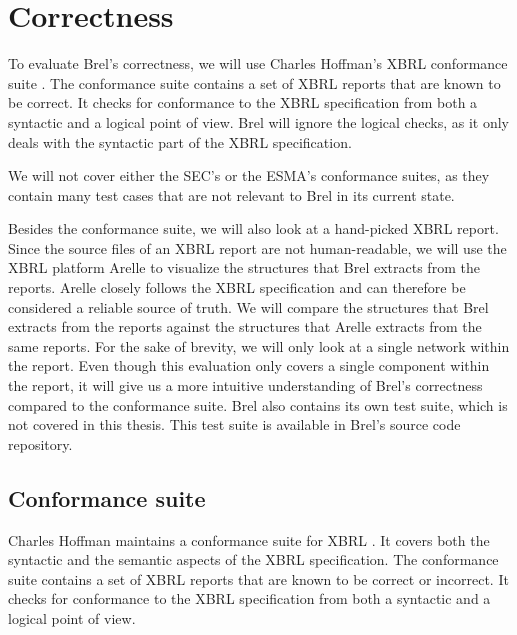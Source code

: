 \section{Correctness}
\label{sec:correctness}

To evaluate Brel's correctness, we will use Charles Hoffman's XBRL conformance suite \cite{hoffman_conformance_suite}.
The conformance suite contains a set of XBRL reports that are known to be correct.
It checks for conformance to the XBRL specification from both a syntactic and a logical point of view.
Brel will ignore the logical checks, as it only deals with the syntactic part of the XBRL specification.

We will not cover either the SEC's or the ESMA's conformance suites, 
as they contain many test cases that are not relevant to Brel in its current state.

Besides the conformance suite, we will also look at a hand-picked XBRL report.
Since the source files of an XBRL report are not human-readable, 
we will use the XBRL platform Arelle\cite{arelle} to visualize the structures that Brel extracts from the reports.
Arelle closely follows the XBRL specification and can therefore be considered a reliable source of truth.
We will compare the structures that Brel extracts from the reports against the structures that Arelle extracts from the same reports.
For the sake of brevity, we will only look at a single network within the report.
Even though this evaluation only covers a single component within the report,
it will give us a more intuitive understanding of Brel's correctness compared to the conformance suite.
Brel also contains its own test suite, which is not covered in this thesis.
This test suite is available in Brel's source code repository\cite{brel_source}.

\subsection{Conformance suite}

Charles Hoffman maintains a conformance suite for XBRL \cite{hoffman_conformance_suite}.
It covers both the syntactic and the semantic aspects of the XBRL specification.
The conformance suite contains a set of XBRL reports that are known to be correct or incorrect.
It checks for conformance to the XBRL specification from both a syntactic and a logical point of view.

